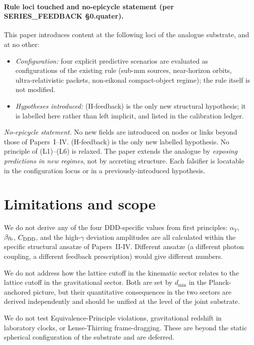 \documentclass[11pt,a4paper]{article}
\begin{document}
\paragraph{Rule loci touched and no-epicycle statement (per SERIES\_FEEDBACK §0.quater).}
This paper introduces content at the following loci of the
analogue substrate, and at no other:

\begin{itemize}
\item \emph{Configuration:} four explicit predictive scenarios are evaluated as configurations of the existing rule (sub-mm sources, near-horizon orbits, ultra-relativistic packets, non-eikonal compact-object regime); the rule itself is not modified.
\item \emph{Hypotheses introduced:} (H-feedback) is the only new structural hypothesis; it is labelled here rather than left implicit, and listed in the calibration ledger.
\end{itemize}

\noindent\emph{No-epicycle statement.} No new fields are introduced on nodes or links beyond those of Papers~I--IV. (H-feedback) is the only new labelled hypothesis. No principle of (L1)--(L6) is relaxed. The paper extends the analogue by \emph{exposing predictions in new regimes}, not by accreting structure. Each falsifier is locatable in the configuration locus or in a previously-introduced hypothesis.
\section{Limitations and scope}
\label{sec:not}

We do not derive any of the four DDD-specific values from first
principles: $\alpha_Y$, $\beta_{\rm fb}$, $C_{\rm DDD}$, and the
high-$\gamma$ deviation amplitudes are all calculated within the
specific structural ansatze of Papers~II-IV. Different ansatze (a
different photon coupling, a different feedback prescription) would
give different numbers.

We do not address how the lattice cutoff in the kinematic sector
relates to the lattice cutoff in the gravitational sector. Both are
set by $d_{\min}$ in the Planck-anchored picture, but their
quantitative consequences in the two sectors are derived
independently and should be unified at the level of the joint
substrate.

We do not test Equivalence-Principle violations, gravitational
redshift in laboratory clocks, or Lense-Thirring frame-dragging.
These are beyond the static spherical configuration of the
substrate and are deferred.
\end{document}
